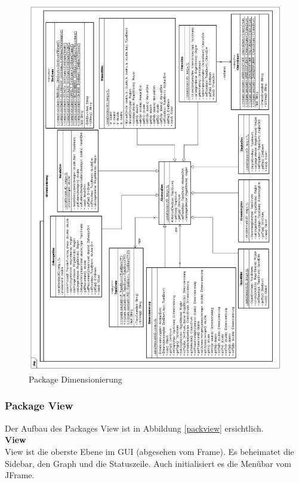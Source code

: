\begin{figure}[p]
\centering
\includegraphics[width=1\textwidth]{packdim.png}
\caption{Package Dimensionierung}
\label{packdim}
\end{figure}

\newpage
\subsubsection{Package View}
Der Aufbau des Packages View ist in Abbildung \ref{packview} ersichtlich.\\

\textbf{View}\\
View ist die oberste Ebene im GUI (abgesehen vom Frame). Es beheimatet die Sidebar, den Graph und die Statuszeile. Auch initialisiert es die Menübar vom JFrame.\\

